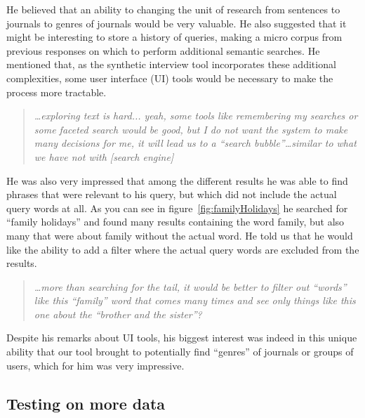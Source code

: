 \documentclass{sigchi}
\begin{document}
He believed that an ability to changing the unit of research from sentences to journals to genres of journals would be very valuable. He also suggested that it might be interesting to store a history of queries, making a micro corpus from previous responses on which to perform additional semantic searches. He mentioned that, as the synthetic interview tool incorporates these additional complexities, some user interface (UI) tools would be necessary to make the process more tractable. 

\begin{quote}
{\em
\dots exploring text is hard... yeah, some tools like remembering my searches or some faceted search would be good, but I do not want the system to make many decisions for me, it will lead us to a ``search bubble''\dots similar to what we have not with [search engine]
}\end{quote}

He was also very impressed that among the different results he was able to find phrases that were relevant to his query, but which did not include the actual query words at all. As you can see in figure~\ref{fig:familyHolidays} he searched for ``family holidays'' and found many results containing the word family, but also many that were about family without the actual word. He told us that he would like the ability to add a filter where the actual query words are excluded from the results.

\begin{quote}
{\em
\dots more than searching for the tail, it would be better to filter out ``words'' like this ``family'' word that comes many times and see only things like this one about the ``brother and the sister''?
}\end{quote}

Despite his remarks about UI tools, his biggest interest was indeed in this unique ability that our tool brought to potentially find ``genres'' of journals or groups of users, which for him was very impressive.

\subsection{Testing on more data}
\end{document}
